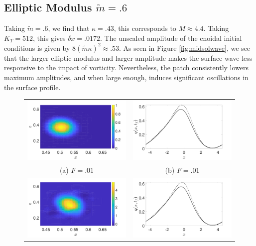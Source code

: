 \documentclass[a4paper,11pt]{article}
\begin{document}
\subsection*{Elliptic Modulus $\tilde{m}=.6$}
Taking $\tilde{m}=.6$, we find that $\kappa = .43$, this corresponds to $M \approx 4.4$.  Taking $K_{T}=512$, this gives $\delta x = .0172$.  The unscaled amplitude of the cnoidal initial conditions is given by $8(\tilde{m}\kappa)^{2}\approx .53$.  As seen in Figure \ref{fig:midsolwave}, we see that the larger elliptic modulus and larger amplitude makes the surface wave less responsive to the impact of vorticity.  Nevertheless, the patch consistently lowers maximum amplitudes, and when large enough, induces significant oscillations in the surface profile.  
\begin{figure}
\centering
\begin{tabular}{cc}
\includegraphics[width=.45\textwidth]{vorticity_wm_1_modu_pt6} & \includegraphics[width=.45\textwidth]{profiles_wm_1_modu_pt6}\\
(a)  $F=.01$ & (b)  $F=.01$\\
\includegraphics[width=.45\textwidth]{vorticity_wm_5_modu_pt6} & \includegraphics[width=.45\textwidth]{profiles_wm_5_modu_pt6}\\

\end{tabular}
\end{figure}
\end{document}
